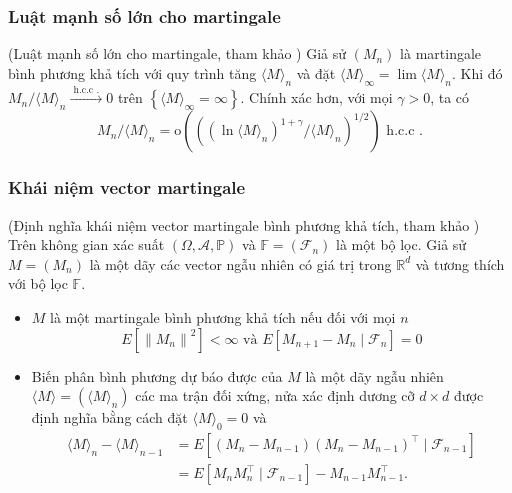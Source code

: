 \subsubsection{Luật mạnh số lớn cho martingale}
{\dl (Luật mạnh số lớn cho martingale, tham khảo \cite{duflo}) Giả sử $\left(M_n\right)$ là martingale bình phương khả tích với quy trình tăng $\langle M\rangle_n$ và đặt $\langle M\rangle_{\infty}=\lim \langle M\rangle_n$. Khi đó $M_n /\langle M\rangle_n \xrightarrow{\text { h.c.c . }} 0$ trên $\left\{\langle M\rangle_{\infty}=\infty\right\}$. Chính xác hơn, với mọi $\gamma>0$, ta có
$$
M_n /\langle M\rangle_n=\mathrm{o}\left(\left(\left(\ln \langle M\rangle_n\right)^{1+\gamma} /\langle M\rangle_n\right)^{1 / 2}\right) \text{       h.c.c .}
$$
}
\subsubsection{Khái niệm vector martingale}
{\dn (Định nghĩa khái niệm vector martingale bình phương khả tích, tham khảo \cite{duflo}) Trên không gian xác suất $(\Omega, \mathcal{A}, \mathbb{P})$ và $\mathbb{F}=\left(\mathcal{F}_n\right)$ là một bộ lọc. Giả sử $M=\left(M_n\right)$ là một dãy các vector ngẫu nhiên có giá trị trong $\mathbb{R}^d$ và tương thích với bộ lọc $\mathbb{F}$.
\begin{itemize}
    \item $M$ là một martingale bình phương khả tích nếu đối với mọi $n$
$$
E\left[\left\|M_n\right\|^2\right]<\infty \text { và } E\left[M_{n+1}-M_n \mid \mathcal{F}_n\right]=0
$$
\item Biến phân bình phương dự báo được của $M$ là một dãy ngẫu nhiên $\langle M\rangle=\left(\langle M\rangle_n\right)$ các ma trận đối xứng, nửa xác định dương cỡ $d \times d$ được định nghĩa bằng cách đặt $\langle M\rangle_0=0$ và
$$
\begin{aligned}
\langle M\rangle_n-\langle M\rangle_{n-1} & =E\left[\left(M_n-M_{n-1}\right)\left(M_n-M_{n-1}\right)^{\top} \mid \mathcal{F}_{n-1}\right] \\
& =E\left[M_nM_n^{\top} \mid \mathcal{F}_{n-1}\right]-M_{n-1}M_{n-1}^{\top} .
\end{aligned}
$$
\end{itemize}
}
